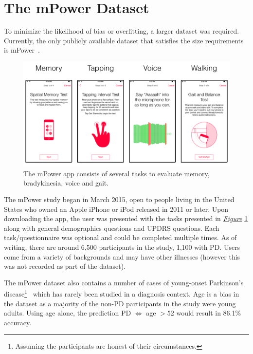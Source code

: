 \documentclass[12pt, twoside]{book}
\begin{document}
\section{The mPower Dataset}
\label{mpower}
To minimize the likelihood of bias or overfitting, a larger dataset was required. Currently, the only publicly available dataset that satisfies the size requirements is mPower~\cite{mpower}. 

\begin{figure}[h]
\label{mpowerapp}
\centering\includegraphics[width=1\linewidth]{mpower.png}
\caption{The mPower app consists of several tasks to evaluate memory, bradykinesia, voice and gait. }
\end{figure}

The mPower study began in March 2015, open to people living in the United States who owned an Apple iPhone or iPod released in 2011 or later. Upon downloading the app, the user was presented with the tasks presented in \textit{\hyperref[mpower]{Figure}} \ref{mpower} along with general demographics questions and UPDRS questions. Each task/questionnaire was optional and could be completed multiple times. As of writing, there are around 6,500 participants in the study, 1,100 with PD. Users come from a variety of backgrounds and may have other illnesses (however this was not recorded as part of the dataset).

The mPower dataset also contains a number of cases of young-onset Parkinson's disease\footnote{Assuming the participants are honest of their circumstances.}~\cite{youngpd1, youngpd2} which has rarely been studied in a diagnosis context. Age is a bias in the dataset as a majority of the non-PD participants in the study were young adults. Using age alone, the prediction PD $\Leftrightarrow$ age $> 52$ would result in 86.1\% accuracy.
\end{document}
